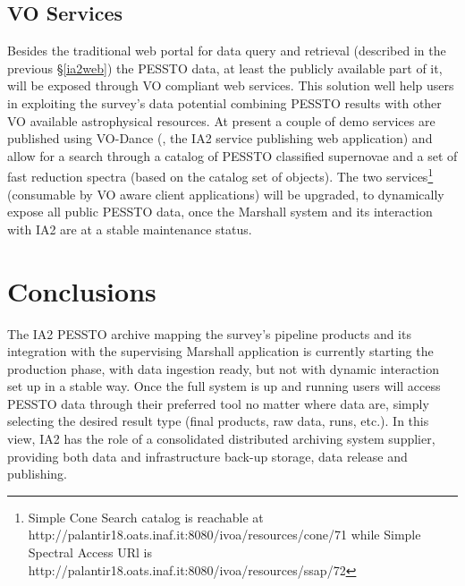 \subsection{VO Services}\label{vo}
Besides the traditional web portal for data query and retrieval (described in the previous \S\ref{ia2web}) the PESSTO data, at least the publicly available part of it, will be exposed through VO compliant web services. This solution well help users in exploiting the survey's data potential combining PESSTO results with other VO available astrophysical resources. At present a couple of demo services are published using VO-Dance (\cite{molinaro_spie12}, the IA2 service publishing web application) and allow for a search through a catalog of PESSTO classified supernovae and a set of fast reduction spectra (based on the catalog set of objects). The two services\footnote{Simple Cone Search catalog is reachable at http://palantir18.oats.inaf.it:8080/ivoa/resources/cone/71 while Simple Spectral Access URl is http://palantir18.oats.inaf.it:8080/ivoa/resources/ssap/72} (consumable by VO aware client applications) will be upgraded, to dynamically expose all public PESSTO data, once the Marshall system and its interaction with IA2 are at a stable maintenance status.

\section{Conclusions}

The IA2 PESSTO archive mapping the survey's pipeline products and its integration with the supervising Marshall application is currently starting the production phase, with data ingestion ready, but not with dynamic interaction set up in a stable way. Once the full system is up and running users will access PESSTO data through their preferred tool no matter where data are, simply selecting the desired result type (final products, raw data, runs, etc.). In this view, IA2 has the role of a consolidated distributed archiving system supplier, providing both data and infrastructure back-up storage, data release and publishing.

